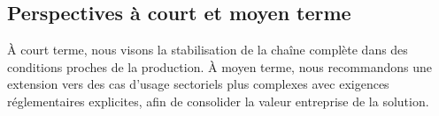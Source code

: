 \documentclass[11pt,a4paper]{article}
\begin{document}
\subsection*{Perspectives à court et moyen terme}
À court terme, nous visons la stabilisation de la chaîne complète dans des conditions proches de la production. À moyen terme, nous recommandons une extension vers des cas d'usage sectoriels plus complexes avec exigences réglementaires explicites, afin de consolider la valeur entreprise de la solution.
\end{document}
